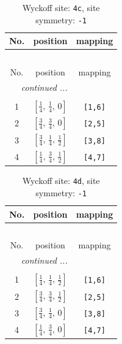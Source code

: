 \documentclass[fleqn,8pt]{jsarticle}
\begin{document}
\renewcommand{\arraystretch}{1.2}
\begin{longtable}{ccc}
\caption{Wyckoff site: {\tt 4c}, site symmetry: {\tt -1}}
 \\
 \hline \hline
No. & position & mapping \\ \hline \endfirsthead

\multicolumn{2}{l}{\tablename\ \thetable{}} \\
 \hline \hline
No. & position & mapping \\ \hline \endhead

 \hline \hline
\multicolumn{2}{r}{\footnotesize\it continued ...} \\ \endfoot

 \hline \hline
\multicolumn{2}{r}{} \\ \endlastfoot

1 & $\left[ \frac{1}{4},\, \frac{1}{4},\, 0 \right]$ & {\tt [1,6]} \\ \hline
2 & $\left[ \frac{3}{4},\, \frac{3}{4},\, 0 \right]$ & {\tt [2,5]} \\ \hline
3 & $\left[ \frac{3}{4},\, \frac{1}{4},\, \frac{1}{2} \right]$ & {\tt [3,8]} \\ \hline
4 & $\left[ \frac{1}{4},\, \frac{3}{4},\, \frac{1}{2} \right]$ & {\tt [4,7]} \\
\end{longtable}
\renewcommand{\arraystretch}{1.2}
\begin{longtable}{ccc}
\caption{Wyckoff site: {\tt 4d}, site symmetry: {\tt -1}}
 \\
 \hline \hline
No. & position & mapping \\ \hline \endfirsthead

\multicolumn{2}{l}{\tablename\ \thetable{}} \\
 \hline \hline
No. & position & mapping \\ \hline \endhead

 \hline \hline
\multicolumn{2}{r}{\footnotesize\it continued ...} \\ \endfoot

 \hline \hline
\multicolumn{2}{r}{} \\ \endlastfoot

1 & $\left[ \frac{1}{4},\, \frac{1}{4},\, \frac{1}{2} \right]$ & {\tt [1,6]} \\ \hline
2 & $\left[ \frac{3}{4},\, \frac{3}{4},\, \frac{1}{2} \right]$ & {\tt [2,5]} \\ \hline
3 & $\left[ \frac{3}{4},\, \frac{1}{4},\, 0 \right]$ & {\tt [3,8]} \\ \hline
4 & $\left[ \frac{1}{4},\, \frac{3}{4},\, 0 \right]$ & {\tt [4,7]} \\
\end{longtable}
\end{document}

